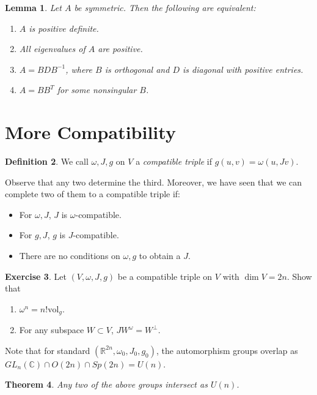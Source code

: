 \documentclass[leqno, openany]{memoir}
\newtheorem{thm}{Theorem}[chapter]
\newtheorem{lem}[thm]{Lemma}
\theoremstyle{definition}
\newtheorem{defn}[thm]{Definition}
\newtheorem{exer}[thm]{Exercise}
\theoremstyle{remark}
\theoremstyle{plain}
\theoremstyle{definition}
\theoremstyle{remark}
\newcommand{\R}{\mathbb{R}}
\newcommand{\C}{\mathbb{C}}
\newcommand{\mr}[1]{\mathrm{#1}}
\begin{document}
\begin{lem}
    Let $A$ be symmetric. Then the following are equivalent:
    \begin{enumerate}
        \item $A$ is positive definite.
        \item All eigenvalues of $A$ are positive.
        \item $A = BDB^{-1}$, where $B$ is orthogonal and $D$ is diagonal with positive entries.
        \item $A = BB^T$ for some nonsingular $B$.
    \end{enumerate}
\end{lem}

\section{More Compatibility}%
\label{sec:more_compatibility}

\begin{defn}
    We call $\omega, J, g$ on $V$ a \textit{compatible triple} if $g(u, v) = \omega(u, Jv)$.
\end{defn}

Observe that any two determine the third. Moreover, we have seen that we can complete two of them to a compatible triple if:
\begin{itemize}
    \item For $\omega, J$, $J$ is $\omega$-compatible.
    \item For $g, J$, $g$ is $J$-compatible.
    \item There are no conditions on $\omega, g$ to obtain a $J$.
\end{itemize}

\begin{exer}
    Let $(V, \omega, J, g)$ be a compatible triple on $V$ with $\dim V = 2n$. Show that 
    \begin{enumerate}[label=(\alph*)]
        \item $\omega^n = n! \mr{vol}_g$.
        \item For any subspace $W \subset V$, $J W^{\omega} = W^{\perp}$.
    \end{enumerate}
\end{exer}

Note that for standard $(\R^{2n}, \omega_0, J_0, g_0)$, the automorphism groups overlap as $GL_n(\C) \cap O(2n) \cap Sp(2n) = U(n)$.

\begin{thm}
    Any two of the above groups intersect as $U(n)$.
\end{thm}
\end{document}
